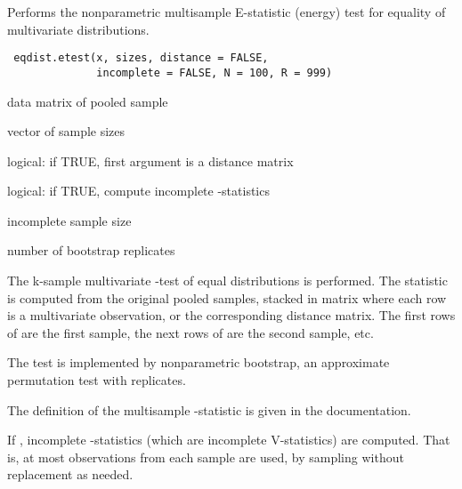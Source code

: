 \begin{Description}\relax
Performs the nonparametric multisample E-statistic (energy) test
for equality of multivariate distributions.
\end{Description}
\begin{Usage}
\begin{verbatim}
 eqdist.etest(x, sizes, distance = FALSE, 
              incomplete = FALSE, N = 100, R = 999)
\end{verbatim}
\end{Usage}
\begin{Arguments}
\begin{ldescription}
\item[\code{x}] data matrix of pooled sample
\item[\code{sizes}] vector of sample sizes
\item[\code{distance}] logical: if TRUE, first argument is a distance matrix
\item[\code{incomplete}] logical: if TRUE, compute incomplete -statistics
\item[\code{N}] incomplete sample size
\item[\code{R}] number of bootstrap replicates 
\end{ldescription}
\end{Arguments}
\begin{Details}\relax
The k-sample multivariate -test of equal distributions
is performed. The statistic is computed from the original
pooled samples, stacked in matrix  where each row
is a multivariate observation, or the corresponding distance matrix. The
first  rows of  are the first sample, the next
 rows of  are the second sample, etc.

The test is implemented by nonparametric bootstrap, an approximate 
permutation test with  replicates.

The definition of the multisample -statistic is given in the 
 documentation.

If , incomplete -statistics (which are
incomplete V-statistics) are computed. That is, at most
 observations from each sample are used, by sampling without replacement 
as needed.\end{Details}
